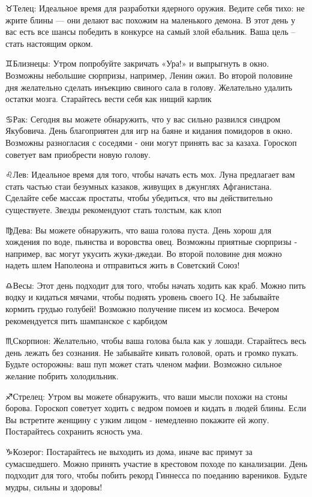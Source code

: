 \documentclass{article}
\begin{document}
\begin{multicols}{3}
♉️Телец: Идеальное время для разработки ядерного оружия. Ведите себя тихо: не жрите блины — они делают вас похожим на маленького демона. В этот день у вас есть все шансы победить в конкурсе на самый злой ебальник. Ваша цель – стать настоящим орком.

♊️Близнецы: Утром попробуйте закричать «Ура!» и выпрыгнуть в окно. Возможны небольшие сюрпризы, например, Ленин ожил. Во второй половине дня желательно сделать инъекцию свиного сала в голову. Желательно удалить остатки мозга. Старайтесь вести себя как нищий карлик

♋️Рак: Сегодня вы можете обнаружить, что у вас сильно развился синдром Якубовича. День благоприятен для игр на баяне и кидания помидоров в окно. Возможны разногласия с соседями - они могут принять вас за казаха. Гороскоп советует вам приобрести новую голову.

♌️Лев: Идеальное время для того, чтобы начать есть мох. Луна предлагает вам стать частью стаи безумных казаков, живущих в джунглях Афганистана. Сделайте себе массаж простаты, чтобы убедиться, что вы действительно существуете. Звезды рекомендуют стать толстым, как клоп

♍️Дева: Вы можете обнаружить, что ваша голова пуста. День хорош для хождения по воде, пьянства и воровства овец. Возможны приятные сюрпризы - например, вас могут укусить жуки-джедаи. Во второй половине дня можно надеть шлем Наполеона и отправиться жить в Советский Союз!

♎️Весы: Этот день подходит для того, чтобы начать ходить как краб. Можно пить водку и кидаться мячами, чтобы поднять уровень своего IQ. Не забывайте  кормить грудью голубей! Возможно получение писем из космоса. Вечером рекомендуется пить шампанское с карбидом

♏️Скорпион: Желательно, чтобы ваша голова была как у лошади. Старайтесь весь день лежать без сознания. Не забывайте кивать головой, орать и громко пукать. Будьте осторожны: ваш пуп может стать членом мафии. Возможно сильное желание побрить холодильник.

♐️Стрелец: Утром вы можете обнаружить, что ваши мысли похожи на стоны борова. Гороскоп советует ходить с ведром помоев и кидать в людей блины. Если Вы встретите женщину с узким лицом - немедленно покажите ей жопу. Постарайтесь сохранить ясность ума.

♑️Козерог: Постарайтесь не выходить из дома, иначе вас примут за сумасшедшего. Можно принять участие в крестовом походе по канализации. День подходит для того, чтобы побить рекорд Гиннесса по поеданию вареников. Будьте мудры, сильны и здоровы!


\end{multicols}
\end{document}

